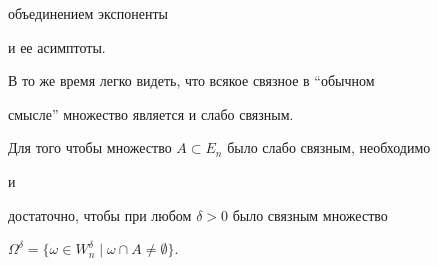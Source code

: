 объединением экспоненты 


и ее асимптоты.





В то же время легко видеть, что всякое связное в ``обычном 


смысле'' множество является и слабо связным. 


 


\begin{lem} 


Для того чтобы множество $A\subset E_n$ было слабо связным, необходимо 


и 


достаточно, чтобы при любом $\delta>0$ было связным множество 


$\Omega^\delta=\{\omega\in W^\delta_n\mid\omega\cap A\ne\emptyset\}$. 


\end{lem} 


 


